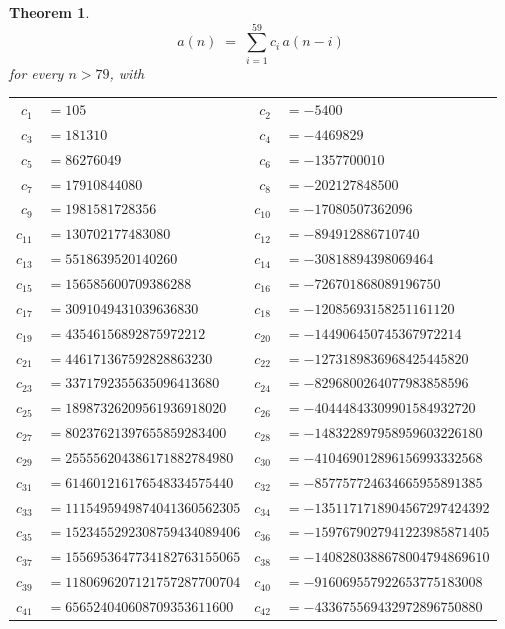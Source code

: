 \documentclass[11pt,a4paper]{article}
\theoremstyle{plain}
\newtheorem{theorem}{Theorem}
\theoremstyle{definition}
\begin{document}
\begin{theorem}
\[
a(n)\;=\;\sum_{i=1}^{59}c_i\,a(n-i)
\]
for every $n>79$, with
\begin{center}\footnotesize
\begin{tabular}{r@{\,}l@{\qquad}r@{\,}l}
$c_{1}$ & $=105$ & $c_{2}$ & $=-5400$ \\
$c_{3}$ & $=181310$ & $c_{4}$ & $=-4469829$ \\
$c_{5}$ & $=86276049$ & $c_{6}$ & $=-1357700010$ \\
$c_{7}$ & $=17910844080$ & $c_{8}$ & $=-202127848500$ \\
$c_{9}$ & $=1981581728356$ & $c_{10}$ & $=-17080507362096$ \\
$c_{11}$ & $=130702177483080$ & $c_{12}$ & $=-894912886710740$ \\
$c_{13}$ & $=5518639520140260$ & $c_{14}$ & $=-30818894398069464$ \\
$c_{15}$ & $=156585600709386288$ & $c_{16}$ & $=-726701868089196750$ \\
$c_{17}$ & $=3091049431039636830$ & $c_{18}$ & $=-12085693158251161120$ \\
$c_{19}$ & $=43546156892875972212$ & $c_{20}$ & $=-144906450745367972214$ \\
$c_{21}$ & $=446171367592828863230$ & $c_{22}$ & $=-1273189836968425445820$ \\
$c_{23}$ & $=3371792355635096413680$ & $c_{24}$ & $=-8296800264077983858596$ \\
$c_{25}$ & $=18987326209561936918020$ & $c_{26}$ & $=-40444843309901584932720$ \\
$c_{27}$ & $=80237621397655859283400$ & $c_{28}$ & $=-148322897958959603226180$ \\
$c_{29}$ & $=255556204386171882784980$ & $c_{30}$ & $=-410469012896156993332568$ \\
$c_{31}$ & $=614601216176548334575440$ & $c_{32}$ & $=-857757724634665955891385$ \\
$c_{33}$ & $=1115495949874041360562305$ & $c_{34}$ & $=-1351171718904567297424392$ \\
$c_{35}$ & $=1523455292308759434089406$ & $c_{36}$ & $=-1597679027941223985871405$ \\
$c_{37}$ & $=1556953647734182763155065$ & $c_{38}$ & $=-1408280388678004794869610$ \\
$c_{39}$ & $=1180696207121757287700704$ & $c_{40}$ & $=-916069557922653775183008$ \\
$c_{41}$ & $=656524040608709353611600$ & $c_{42}$ & $=-433675569432972896750880$ \\

\end{tabular}
\end{center}
\end{theorem}
\end{document}
